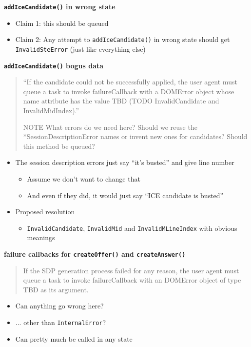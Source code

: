 \documentclass[helvetica]{seminar}
\newcommand{\heading}[1]{%
  \begin{center} 
    \large\bf 
    #1 
  \end{center} 
  \vspace{.4 in}}
\begin{document}
\begin{slide}
\heading{\texttt{addIceCandidate()} in wrong state}

\begin{itemize}
\item Claim 1: this should be queued
\item Claim 2: Any attempt to \verb^addIceCandidate()^ in wrong state should get \verb^InvalidSteError^ (just like everything else)
\end{itemize}
\end{slide}


\begin{slide}
\heading{\texttt{addIceCandidate()} bogus data}

\vspace{-3ex}
\small{
\begin{quote}
``If the candidate could not be successfully applied, the user agent
must queue a task to invoke failureCallback with a DOMError object
whose name attribute has the value TBD (TODO InvalidCandidate and
InvalidMidIndex).''

NOTE What errors do we need here? Should we reuse the
*SessionDescriptionError names or invent new ones for
candidates? Should this method be queued?
\end{quote}
}

\begin{itemize}
\item The session description errors just say ``it's busted'' and give line number
  \begin{itemize}
  \item Assume we don't want to change that
  \item And even if they did, it would just say ``ICE candidate is busted''
  \end{itemize}

\item Proposed resolution
  \begin{itemize}
  \item \verb^InvalidCandidate^, \verb^InvalidMid^ and \verb^InvalidMLineIndex^ with obvious meanings
  \end{itemize}
\end{itemize}
\end{slide}


\begin{slide}
\heading{failure callbacks for \texttt{createOffer()} and \texttt{createAnswer()}}

\begin{quote}
If the SDP generation process failed for any reason, the user agent
must queue a task to invoke failureCallback with an DOMError object of
type TBD as its argument.
\end{quote}

\begin{itemize}
\item Can anything go wrong here?
\item ... other than \verb^InternalError^?
\item Can pretty much be called in any state
\end{itemize}
\end{slide}
\end{document}
